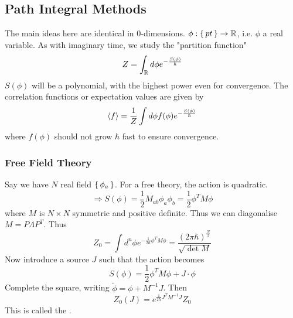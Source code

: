 \documentclass{article}
\begin{document}
\subsection{Path Integral Methods} 
The main ideas here are identical in 0-dimensions. $\phi:\set{pt}\to\mathbb{R}$, i.e. $\phi$ a real variable. As with imaginary time, we study the "partition function"
\[
Z = \int_{\mathbb{R}} d\phi e^{-\frac{S(\phi)}{\hbar}}
\]
$S(\phi)$ will be a polynomial, with the highest power even for convergence. The  correlation functions or expectation values are given by 
\[
\braket{ f } = \frac{1}{Z} \int d\phi f(\phi) e^{-\frac{S(\phi)}{\hbar}}
\]
where $f(\phi)$ should not grow $\hbar$ fast to ensure convergence. 

\subsubsection*{Free Field Theory}
Say we have $N$ real field $\set{\phi_a}$. For a free theory, the action is quadratic. 
\[
\Rightarrow S(\phi) = \frac{1}{2} M_{ab} \phi_a \phi_b = \frac{1}{2} \phi^T M \phi 
\]
where $M$ is $N\times N$ symmetric and positive definite. Thus we can diagonalise $M= P\Lambda P^T$. Thus 
\[
Z_0 = \int d^n \phi e^{-\frac{1}{2\hbar}\phi^T M \phi} = \frac{(2\pi\hbar)^{\frac{N}{2}}}{\sqrt{\det M}}
\]
Now introduce a source $J$ such that the action becomes 
\[
S(\phi) = \frac{1}{2} \phi^T M \phi  + J\cdot\phi
\]
Complete the square, writing $\tilde{\phi} = \phi + M^{-1}J$. Then 
\[
Z_0(J) = e^{\frac{1}{2\hbar}J^T M^{-1}J}Z_0
\]
This is called the .
\end{document}
